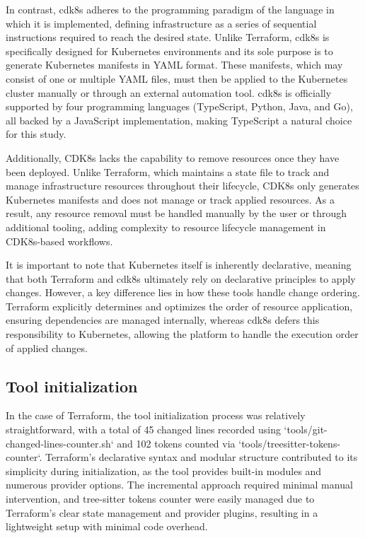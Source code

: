 \documentclass{article}
\begin{document}
In contrast, cdk8s adheres to the programming paradigm of the language in which it is implemented, defining infrastructure as a series of sequential instructions required to reach the desired state. Unlike Terraform, cdk8s is specifically designed for Kubernetes environments and its sole purpose is to generate Kubernetes manifests in YAML format. These manifests, which may consist of one or multiple YAML files, must then be applied to the Kubernetes cluster manually or through an external automation tool. cdk8s is officially supported by four programming languages (TypeScript, Python, Java, and Go), all backed by a JavaScript implementation, making TypeScript a natural choice for this study.

Additionally, CDK8s lacks the capability to remove resources once they have been deployed. Unlike Terraform, which maintains a state file to track and manage infrastructure resources throughout their lifecycle, CDK8s only generates Kubernetes manifests and does not manage or track applied resources. As a result, any resource removal must be handled manually by the user or through additional tooling, adding complexity to resource lifecycle management in CDK8s-based workflows.

It is important to note that Kubernetes itself is inherently declarative, meaning that both Terraform and cdk8s ultimately rely on declarative principles to apply changes. However, a key difference lies in how these tools handle change ordering. Terraform explicitly determines and optimizes the order of resource application, ensuring dependencies are managed internally, whereas cdk8s defers this responsibility to Kubernetes, allowing the platform to handle the execution order of applied changes.

\subsection{Tool initialization}
In the case of Terraform, the tool initialization process was relatively straightforward, with a total of 45 changed lines recorded using `tools/git-changed-lines-counter.sh` and 102 tokens counted via `tools/treesitter-tokens-counter`. Terraform's declarative syntax and modular structure contributed to its simplicity during initialization, as the tool provides built-in modules and numerous provider options. The incremental approach required minimal manual intervention, and tree-sitter tokens counter were easily managed due to Terraform’s clear state management and provider plugins, resulting in a lightweight setup with minimal code overhead.
\end{document}
